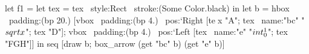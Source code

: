 let f1 =
  let tex = tex ~style:Rect ~stroke:(Some Color.black) in
  let b =
    hbox ~padding:(bp 20.)
      [vbox ~padding:(bp 4.) ~pos:`Right
        [te^^Ax "A"; tex ~name:"bc" "$\\sqrt{x}$"; tex "D"];
       vbox ~padding:(bp 4.) ~pos:`Left
 [tex ~name:"e" "$\\int _0 ^1$"; tex "FGH"]]
  in
  seq [draw b;
       box_arrow (get "bc" b) (get "e" b)]
